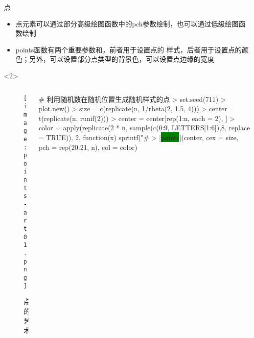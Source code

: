 \begin{frame}[t,fragile]{\subsecname}{点}
\begin{itemize}
\item 点元素可以通过部分高级绘图函数中的pch参数绘制，也可以通过低级绘图函数绘制
\item points函数有两个重要参数和，前者用于设置点的
样式，后者用于设置点的颜色；另外，可以设置部分点类型的背景色，可以设置点边缘的宽度
\end{itemize}

\begin{overlayarea}{\textwidth}{\textheight}

\begin{onlyenv}<2>
  \begin{columns}
    \begin{column}{.4\textwidth}
\centering
\begin{figure}
  \texttt{[image: points-art01.png]}
  \caption{点的艺术}
\end{figure}
    \end{column}

    \begin{column}{.6\textwidth}
\centering
\begin{rcode}
# 利用随机数在随机位置生成随机样式的点
> set.seed(711)
> plot.new()
> size = c(replicate(n, 1/rbeta(2, 1.5, 4)))
> center = t(replicate(n, runif(2)))
> center = center[rep(1:n, each = 2), ]
> color = apply(replicate(2 * n, sample(c(0:9, LETTERS[1:6]),8, replace = TRUE)),
              2, function(x) sprintf("#%
> |\colorbox{green}{points}|(center, cex = size, pch = rep(20:21, n), col = color)
\end{rcode}
    \end{column}
  \end{columns}
\end{onlyenv}


\end{overlayarea}
\end{frame}
